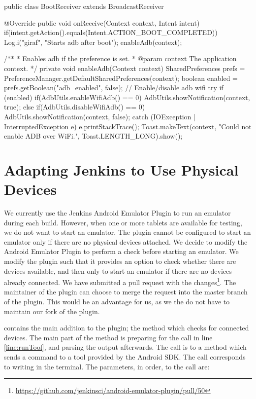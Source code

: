 \begin{javacode}[float,label=lst:android_app_broadcast_receiver,caption=Android boot broadcast receiver]
public class BootReceiver extends BroadcastReceiver {
  @Override
  public void onReceive(Context context, Intent intent) {
    if(intent.getAction().equals(Intent.ACTION_BOOT_COMPLETED)) {
      Log.i("giraf", "Starts adb after boot");
      enableAdb(context);
    }
  }


  /**
  * Enables adb if the preference is set.
  * @param context The application context.
  */
  private void enableAdb(Context context) {
    SharedPreferences prefs = PreferenceManager.getDefaultSharedPreferences(context);
    boolean enabled = prefs.getBoolean("adb_enabled", false);
    // Enable/disable adb wifi
    try {
      if (enabled) {
        if(AdbUtils.enableWifiAdb() == 0) {
          AdbUtils.showNotification(context, true);
        }
      } else {
        if(AdbUtils.disableWifiAdb() == 0) {
          AdbUtils.showNotification(context, false);
        }
      }
    } catch (IOException | InterruptedException e) {
      e.printStackTrace();
      Toast.makeText(context, "Could not enable ADB over WiFi.", Toast.LENGTH_LONG).show();
    }
  }
}
\end{javacode}

\section{Adapting Jenkins to Use Physical Devices}\label{sec:jenkins_physical_devices}
We currently use the Jenkins Android Emulator Plugin to run an emulator during each build. However, when one or more tablets are available for testing, we do not want to start an emulator. The plugin cannot be configured to start an emulator only if there are no physical devices attached. We decide to modify the Android Emulator Plugin to perform a check before starting an emulator. We modify the plugin such that it provides an option to check whether there are devices available, and then only to start an emulator if there are no devices already connected. We have submitted a pull request with the changes\footnote{\url{https://github.com/jenkinsci/android-emulator-plugin/pull/50}}. The maintainer of the plugin can choose to merge the request into the master branch of the plugin. This would be an advantage for us, as we the do not have to maintain our fork of the plugin.

 contains the main addition to the plugin; the method which checks for connected devices. The main part of the method is preparing for the call in line \ref{line:runTool}, and parsing the output afterwards. The call is to a method which sends a command to a tool provided by the Android SDK. The call corresponds to writing  in the terminal. The parameters, in order, to the call are:

